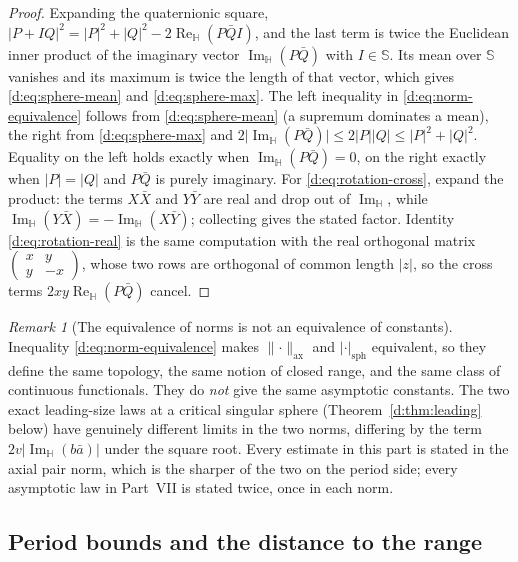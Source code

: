 \documentclass[11pt,a4paper]{article}
\numberwithin{equation}{section}
\theoremstyle{definition}
\theoremstyle{remark}
\newtheorem{remark}[theorem]{Remark}
\theoremstyle{plain}
\newcommand{\HH}{\mathbb H}
\newcommand{\SSS}{\mathbb S}
\DeclareMathOperator{\Rea}{Re}
\DeclareMathOperator{\Ima}{Im}
\newcommand{\ReH}{\Rea_{\HH}}
\newcommand{\ImH}{\Ima_{\HH}}
\newcommand{\axn}[1]{\lVert #1\rVert_{\mathrm{ax}}}   %
\newcommand{\abs}[1]{\lvert #1\rvert}
\begin{document}
\begin{proof}
Expanding the quaternionic square,
$\abs{P+IQ}^2=\abs P^2+\abs Q^2-2\ReH(P\bar QI)$, and the last term is
twice the Euclidean inner product of the imaginary vector $\ImH(P\bar Q)$
with $I\in\SSS$.  Its mean over $\SSS$ vanishes and its maximum is twice
the length of that vector, which gives \eqref{d:eq:sphere-mean} and
\eqref{d:eq:sphere-max}.  The left inequality in
\eqref{d:eq:norm-equivalence} follows from \eqref{d:eq:sphere-mean} (a
supremum dominates a mean), the right from \eqref{d:eq:sphere-max} and
$2\abs{\ImH(P\bar Q)}\le2\abs P\abs Q\le\abs P^2+\abs Q^2$.  Equality on
the left holds exactly when $\ImH(P\bar Q)=0$, on the right exactly when
$\abs P=\abs Q$ and $P\bar Q$ is purely imaginary.  For
\eqref{d:eq:rotation-cross}, expand the product: the terms $X\bar X$ and
$Y\bar Y$ are real and drop out of $\ImH$, while
$\ImH(Y\bar X)=-\ImH(X\bar Y)$; collecting gives the stated factor.
Identity \eqref{d:eq:rotation-real} is the same computation with the real
orthogonal matrix $\left(\begin{smallmatrix}x&y\\ y&-x\end{smallmatrix}
\right)$, whose two rows are orthogonal of common length $\abs z$, so the
cross terms $2xy\ReH(P\bar Q)$ cancel.
\end{proof}

\begin{remark}[The equivalence of norms is not an equivalence of constants]
\label{d:rem:norm-warning}
Inequality \eqref{d:eq:norm-equivalence} makes $\axn\cdot$ and
$\abs\cdot_{\mathrm{sph}}$ equivalent, so they define the same topology,
the same notion of closed range, and the same class of continuous
functionals.  They do \emph{not} give the same asymptotic constants.  The
two exact leading-size laws at a critical singular sphere
(Theorem~\ref{d:thm:leading} below) have genuinely different limits in the
two norms, differing by the term $2v\abs{\ImH(b\bar a)}$ under the square
root.  Every estimate in this part is stated in the axial pair norm, which
is the sharper of the two on the period side; every asymptotic law in
Part~VII is stated twice, once in each norm.
\end{remark}

\subsection{Period bounds and the distance to the range}
\end{document}
